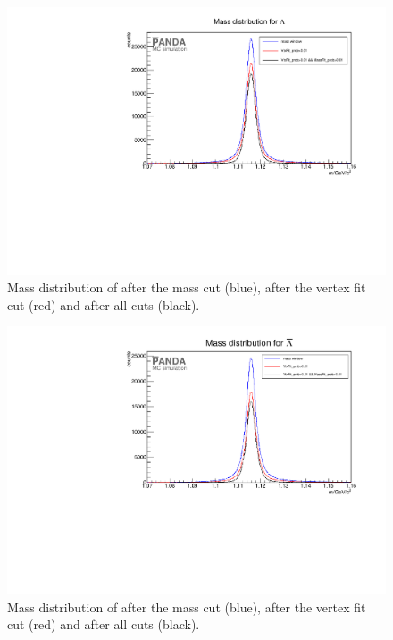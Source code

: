 		\begin{figure}
			\centering
				\includegraphics[width=1.1\textwidth]{./plots/lambda0/lambda0_m_diffcuts.pdf}
			\caption{\propose Mass distribution of \lam after the mass cut (blue), after the vertex fit cut (red) and after all cuts (black).}
			\label{fig:lambda0_massdiffcuts}
		\end{figure}
			
		\begin{figure}
			\centering
				\includegraphics[width=1.1\textwidth]{./plots/antilambda0/antiLambda0_m_diffcuts.pdf}
			\caption{\propose Mass distribution of \alam after the mass cut (blue), after the vertex fit cut (red) and after all cuts (black).}
			\label{fig:antilambda0_massdiffcuts}
		\end{figure}
		
